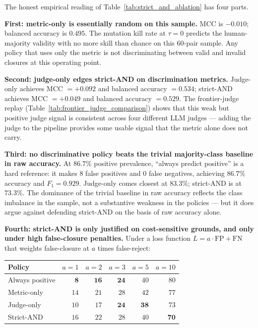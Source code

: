 The honest empirical reading of Table~\ref{tab:strict_and_ablation}
has four parts.

\textbf{First: metric-only is essentially random on this sample.} MCC
is $-0.010$; balanced accuracy is $0.495$. The mutation kill rate at
$\tau = 0$ predicts the human-majority validity with no more skill
than chance on this $60$-pair sample. Any policy that uses only the
metric is not discriminating between valid and invalid closures at
this operating point.

\textbf{Second: judge-only edges strict-AND on discrimination metrics.}
Judge-only achieves MCC $=+0.092$ and balanced accuracy $=0.534$;
strict-AND achieves MCC $=+0.049$ and balanced accuracy $=0.529$. The
frontier-judge replay (Table~\ref{tab:frontier_judge_comparison}) shows
that this weak but positive judge signal is consistent across four
different LLM judges --- adding the judge to the pipeline provides
some usable signal that the metric alone does not carry.

\textbf{Third: no discriminative policy beats the trivial majority-class
baseline in raw accuracy.} At $86.7\%$ positive prevalence, ``always
predict positive'' is a hard reference: it makes $8$ false positives and
$0$ false negatives, achieving $86.7\%$ accuracy and $F_1 = 0.929$.
Judge-only comes closest at $83.3\%$; strict-AND is at $73.3\%$. The
dominance of the trivial baseline in raw accuracy reflects the class
imbalance in the sample, not a substantive weakness in the policies ---
but it does argue against defending strict-AND on the basis of raw
accuracy alone.

\textbf{Fourth: strict-AND is only justified on cost-sensitive grounds,
and only under high false-closure penalties.} Under a loss function
$L = a \cdot \mathrm{FP} + \mathrm{FN}$ that weights false-closure at
$a$ times false-reject:

\begin{center}
\begin{tabular}{lrrrrr}
\toprule
Policy & $a=1$ & $a=2$ & $a=3$ & $a=5$ & $a=10$ \\
\midrule
Always positive & $\mathbf{8}$ & $\mathbf{16}$ & $\mathbf{24}$ & $40$ & $80$ \\
Metric-only     & $14$ & $21$ & $28$ & $42$ & $77$ \\
Judge-only      & $10$ & $17$ & $\mathbf{24}$ & $\mathbf{38}$ & $73$ \\
Strict-AND      & $16$ & $22$ & $28$ & $40$ & $\mathbf{70}$ \\
\bottomrule
\end{tabular}
\end{center}


